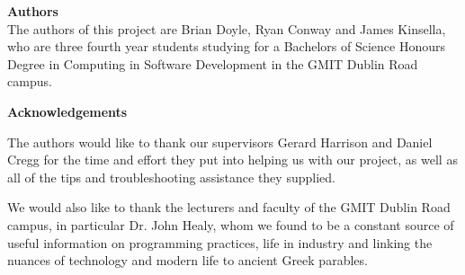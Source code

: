 
\vspace{20mm}
\begin{center}
\large\textbf{Authors}
\\
The authors of this project are Brian Doyle, Ryan Conway and James Kinsella, who are three fourth year students studying for a Bachelors of Science Honours Degree in Computing in Software Development in the GMIT Dublin Road campus.
\\
\end{center}


\large\textbf{Acknowledgements}

The authors would like to thank our supervisors Gerard Harrison and Daniel Cregg for the time and effort they put into helping us with our project, as well as all of the tips and troubleshooting assistance they supplied.

We would also like to thank the lecturers and faculty of the GMIT Dublin Road campus, in particular Dr. John Healy, whom we found to be a constant source of useful information on programming practices, life in industry and linking the nuances of technology and modern life to ancient Greek parables.


